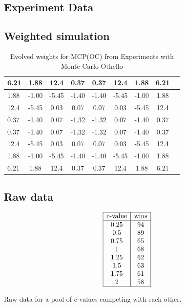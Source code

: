 \documentclass[
11pt, %
english, %
singlespacing, %
headsepline, %
]{MastersDoctoralThesis} %
\begin{document}
\centering
\begin{appendices}
\chapter{Experiment Data}
\section{Weighted simulation}

\begin{table}[H]
	\centering
	\begin{tabular}{|l|c|c|c|c|c|c|c|c|}
		\hline
		6.21 &  1.88 &  12.4 &  0.37 &  0.37 & 12.4  &  1.88 & 6.21 \\
		\hline
		1.88 & -1.00 & -5.45 & -1.40 & -1.40 & -5.45 & -1.00 & 1.88 \\
		\hline
		12.4 & -5.45 &  0.03 &  0.07 &  0.07 &  0.03 & -5.45 & 12.4 \\
		\hline
		0.37 & -1.40 &  0.07 & -1.32 & -1.32 &  0.07 & -1.40 & 0.37 \\
		\hline
		0.37 & -1.40 &  0.07 & -1.32 & -1.32 &  0.07 & -1.40 & 0.37 \\
		\hline
		12.4 & -5.45 &  0.03 &  0.07 &  0.07 &  0.03 & -5.45 & 12.4 \\
		\hline
		1.88 & -1.00 & -5.45 & -1.40 & -1.40 & -5.45 & -1.00 & 1.88 \\
		\hline
		6.21 &  1.88 & 12.4  &  0.37 &  0.37 & 12.4  &  1.88 & 6.21 \\
		\hline
	\end{tabular}
	\caption{Evolved weights for MCP(OC) from Experiments with Monte Carlo Othello\cite{hingston2007experiments}}
	\label{table:othello-weights}
\end{table}

\section{Raw data}
\begin{table}[H]
\[
\begin{array}{|c|c|}
    \hline
    \text{c-value} & \text{wins}\\
    \hline
	0.25 & 94 \\ 
	0.5 & 89 \\ 
	0.75 & 65 \\ 
	1 & 68 \\ 
	1.25 & 62 \\ 
	1.5 & 63 \\ 
	1.75 & 61 \\ 
	2 & 58 \\
	\hline
\end{array} 
\]
\caption{Raw data for a pool of c-values competing with each other.}
\label{table:results-rank-raw}
\end{table}


\end{appendices}
\end{document}
